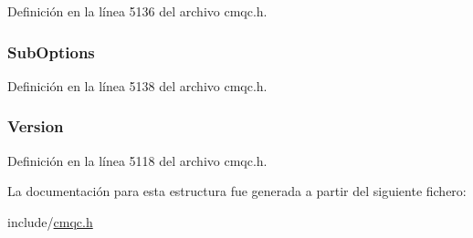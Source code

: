 Definición en la línea 5136 del archivo cmqc.\+h.

\hypertarget{structtag_m_q_s_t_s_a24b93fe1b9f7b2ddc533029552471ca4}{}
\subsubsection[{Sub\+Options}]{ Sub\+Options}\label{structtag_m_q_s_t_s_a24b93fe1b9f7b2ddc533029552471ca4}


Definición en la línea 5138 del archivo cmqc.\+h.

\hypertarget{structtag_m_q_s_t_s_a0656ef8f766b3907d394d88a35d7b7e9}{}
\subsubsection[{Version}]{ Version}\label{structtag_m_q_s_t_s_a0656ef8f766b3907d394d88a35d7b7e9}


Definición en la línea 5118 del archivo cmqc.\+h.



La documentación para esta estructura fue generada a partir del siguiente fichero\+:\begin{DoxyCompactItemize}
\item 
include/\hyperlink{cmqc_8h}{cmqc.\+h}\end{DoxyCompactItemize}
